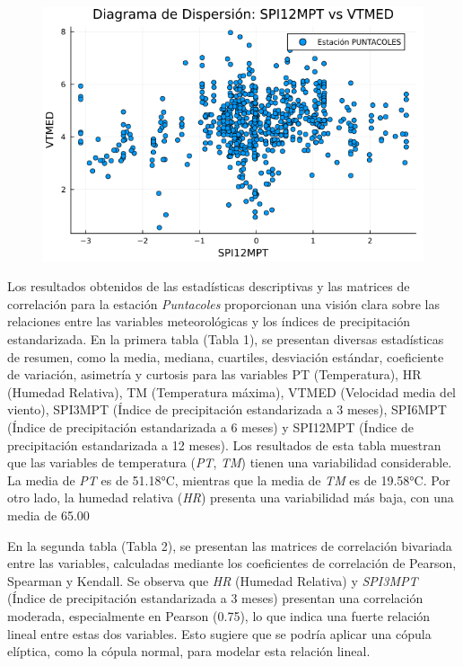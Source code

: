 \begin{figure}[htbp]
\begin{minipage}{0.32\textwidth}
    \includegraphics[width=\linewidth]{Capitulos/Scaterplot/PUNTACOLES_SPI12MPT_vs_VTMED.png}
\end{minipage}

\end{figure}

Los resultados obtenidos de las estadísticas descriptivas y las matrices de correlación para la estación \textit{Puntacoles} proporcionan una visión clara sobre las relaciones entre las variables meteorológicas y los índices de precipitación estandarizada. En la primera tabla (Tabla 1), se presentan diversas estadísticas de resumen, como la media, mediana, cuartiles, desviación estándar, coeficiente de variación, asimetría y curtosis para las variables PT (Temperatura), HR (Humedad Relativa), TM (Temperatura máxima), VTMED (Velocidad media del viento), SPI3MPT (Índice de precipitación estandarizada a 3 meses), SPI6MPT (Índice de precipitación estandarizada a 6 meses) y SPI12MPT (Índice de precipitación estandarizada a 12 meses). Los resultados de esta tabla muestran que las variables de temperatura (\textit{PT}, \textit{TM}) tienen una variabilidad considerable. La media de \textit{PT} es de 51.18°C, mientras que la media de \textit{TM} es de 19.58°C. Por otro lado, la humedad relativa (\textit{HR}) presenta una variabilidad más baja, con una media de 65.00%

En la segunda tabla (Tabla 2), se presentan las matrices de correlación bivariada entre las variables, calculadas mediante los coeficientes de correlación de Pearson, Spearman y Kendall. Se observa que \textit{HR} (Humedad Relativa) y \textit{SPI3MPT} (Índice de precipitación estandarizada a 3 meses) presentan una correlación moderada, especialmente en Pearson (0.75), lo que indica una fuerte relación lineal entre estas dos variables. Esto sugiere que se podría aplicar una cópula elíptica, como la cópula normal, para modelar esta relación lineal. 

